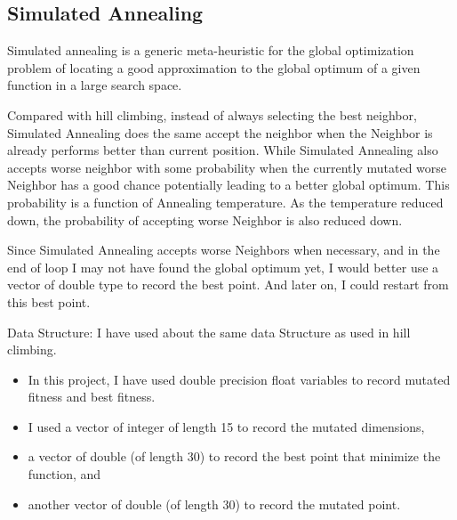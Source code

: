 \documentclass{article}
\begin{document}
\begin{CJK}{UTF8}{gbsn}
\subsection{Simulated Annealing}
Simulated annealing is a generic meta-heuristic for the global optimization problem of locating a good approximation to the global optimum of a given function in a large search space. 

Compared with hill climbing, instead of always selecting the best neighbor, Simulated Annealing does the same accept the neighbor when the Neighbor is already performs better than current position. While Simulated Annealing also accepts worse neighbor with some probability when the currently mutated worse Neighbor has a good chance potentially leading to a better global optimum. This probability is a function of Annealing temperature. As the temperature reduced down, the probability of accepting worse Neighbor is also reduced down.

Since Simulated Annealing accepts worse Neighbors when necessary, and in the end of loop I may not have found the global optimum yet, I would better use a vector of double type to record the best point. And later on, I could restart from this best point.  

\begin{description}
\item Data Structure: 
I have used about the same data Structure as used in hill climbing.
  \begin{itemize}
    \itemsep=-3pt
  \item In this project, I have used double precision float variables to record mutated fitness and best fitness. 
  \item I used a vector of integer of length 15 to record the mutated dimensions, 
  \item a vector of double (of length 30) to record the best point that minimize the function, and
  \item another vector of double (of length 30) to record the mutated point. 
  \end{itemize}


\end{description}
\end{CJK}
\end{document}
